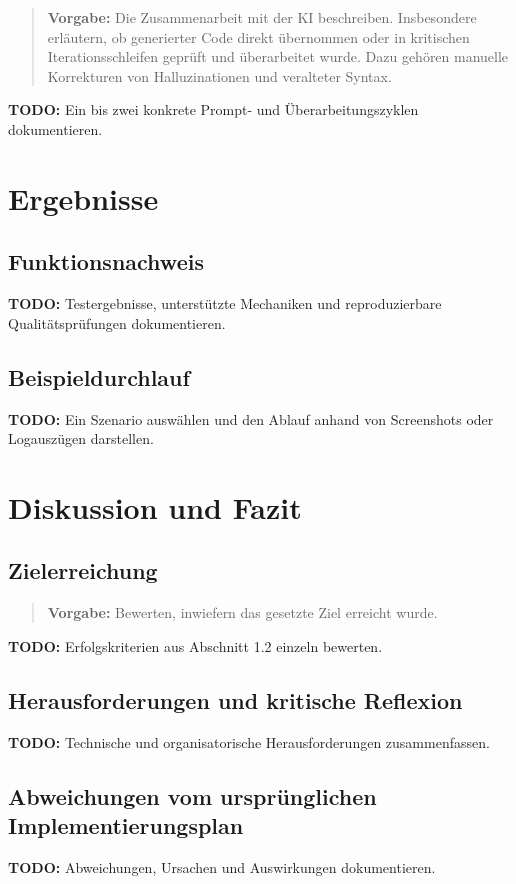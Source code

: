 \documentclass[
  12pt,
  a4paper,
  oneside,
  parskip=half,
  headings=normal
]{scrreprt}
\newcommand{\vorgabe}[1]{%
  \begin{quote}
    \small\color{hinweisfarbe}\textbf{Vorgabe:} #1
  \end{quote}
}
\newcommand{\todo}[1]{%
  \par\noindent\textcolor{red!70!black}{\textbf{TODO:} #1}\par
}
\begin{document}
\vorgabe{Die Zusammenarbeit mit der KI beschreiben. Insbesondere erläutern, ob
generierter Code direkt übernommen oder in kritischen Iterationsschleifen
geprüft und überarbeitet wurde. Dazu gehören manuelle Korrekturen von
Halluzinationen und veralteter Syntax.}

\todo{Ein bis zwei konkrete Prompt- und Überarbeitungszyklen dokumentieren.}

\chapter{Ergebnisse}

\section{Funktionsnachweis}
\todo{Testergebnisse, unterstützte Mechaniken und reproduzierbare
Qualitätsprüfungen dokumentieren.}

\section{Beispieldurchlauf}
\todo{Ein Szenario auswählen und den Ablauf anhand von Screenshots oder
Logauszügen darstellen.}

\chapter{Diskussion und Fazit}

\section{Zielerreichung}
\vorgabe{Bewerten, inwiefern das gesetzte Ziel erreicht wurde.}
\todo{Erfolgskriterien aus Abschnitt 1.2 einzeln bewerten.}

\section{Herausforderungen und kritische Reflexion}
\todo{Technische und organisatorische Herausforderungen zusammenfassen.}

\section{Abweichungen vom ursprünglichen Implementierungsplan}
\todo{Abweichungen, Ursachen und Auswirkungen dokumentieren.}
\end{document}
